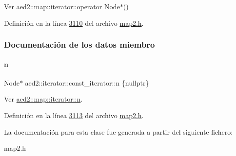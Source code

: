 Ver aed2\+::map\+::iterator\+::operator Node$\ast$() 



Definición en la línea \hyperlink{map2_8h_source_l03110}{3110} del archivo \hyperlink{map2_8h_source}{map2.\+h}.



\subsubsection{Documentación de los datos miembro}
\mbox{\label{classaed2_1_1iterator_1_1const__iterator_a5c8bd59060e4e2b8c1f1b8021cf212cf_a5c8bd59060e4e2b8c1f1b8021cf212cf}} 
\paragraph{\texorpdfstring{n}{n}}
{\footnotesize\ttfamily Node$\ast$ aed2\+::iterator\+::const\+\_\+iterator\+::n \{nullptr\}\hspace{0.3cm}{\ttfamily [private]}}



Ver \hyperlink{classaed2_1_1map_1_1iterator_a1eb67290cc33d9739e0efaf02bbdab9f_a1eb67290cc33d9739e0efaf02bbdab9f}{aed2\+::map\+::iterator\+::n}. 



Definición en la línea \hyperlink{map2_8h_source_l03113}{3113} del archivo \hyperlink{map2_8h_source}{map2.\+h}.



La documentación para esta clase fue generada a partir del siguiente fichero\+:\begin{DoxyCompactItemize}
\item 
map2.\+h\end{DoxyCompactItemize}
